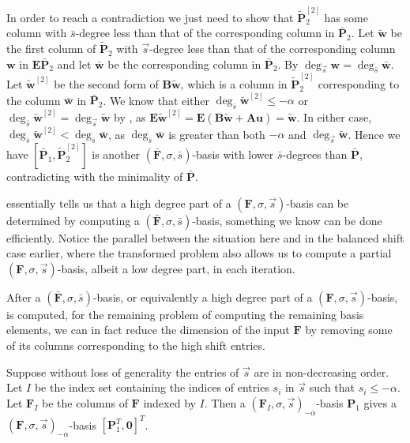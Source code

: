 \begin{pf}
In order to reach a contradiction we just need to show that $\tilde{\mathbf{P}}_{2}^{[2]}$
has some column with $\bar{s}$-degree less than that of the corresponding
column in $\bar{\mathbf{P}}_{2}$. Let $\tilde{\mathbf{w}}$ be the
first column of $\tilde{\mathbf{P}}_{2}$ with $\vec{s}$-degree less
than that of the corresponding column $\mathbf{w}$ in $\mathbf{E}\bar{\mathbf{P}}_{2}$
and let $\bar{\mathbf{w}}$ be the corresponding column in $\bar{\mathbf{P}}_{2}$.
By  $\deg_{\vec{s}}\mathbf{w}=\deg_{\bar{s}}\bar{\mathbf{w}}$.
Let $\tilde{\mathbf{w}}^{[2]}$ be the second form of $\mathbf{B}\tilde{\mathbf{w}}$,
which is a column in $\tilde{\mathbf{P}}_{2}^{[2]}$ corresponding
to the column $\bar{\mathbf{w}}$ in $\bar{\mathbf{P}}_{2}$. We know
that either $\deg_{\bar{s}}\tilde{\mathbf{w}}^{[2]}\le-\alpha$ or
$\deg_{\bar{s}}\tilde{\mathbf{w}}^{[2]}=\deg_{\vec{s}}\tilde{\mathbf{w}}$
by , as $\mathbf{E}\tilde{\mathbf{w}}^{[2]}=\mathbf{E}(\mathbf{B}\tilde{\mathbf{w}}+\mathbf{A}\mathbf{u})=\tilde{\mathbf{w}}$.
In either case, $\deg_{\bar{s}}\tilde{\mathbf{w}}^{[2]}<\deg_{\bar{s}}\bar{\mathbf{w}}$,
as $\deg_{\bar{s}}\bar{\mathbf{w}}$ is greater than both $-\alpha$
and $\deg_{\vec{s}}\tilde{\mathbf{w}}$. Hence we have $[\bar{\mathbf{P}}_{1},\tilde{\mathbf{P}}_{2}^{[2]}]$
is another $\left(\bar{\mathbf{F}},\sigma,\bar{s}\right)$-basis with
lower $\bar{s}$-degrees than $\mathbf{\bar{P}}$, contradicting with
the minimality of $\bar{\mathbf{P}}$. 
\end{pf}
 essentially tells us that
a high degree part of a $\left(\mathbf{F},\sigma,\vec{s}\right)$-basis
can be determined by computing a $\left(\bar{\mathbf{F}},\sigma,\bar{s}\right)$-basis,
something we know can be done efficiently. Notice the parallel between
the situation here and in the balanced shift case earlier, where the
transformed problem also allows us to compute a partial $\left(\mathbf{F},\sigma,\vec{s}\right)$-basis,
albeit a low degree part, in each iteration.

After a $\left(\bar{\mathbf{F}},\sigma,\bar{s}\right)$-basis, or
equivalently a high degree part of a $\left(\mathbf{F},\sigma,\vec{s}\right)$-basis,
is computed, for the remaining problem of computing the remaining
basis elements, we can in fact reduce the dimension of the input $\mathbf{F}$
by removing some of its columns corresponding to the high shift entries. 
\begin{thm}
\label{thm:zeroHighShiftEntries}Suppose without loss of generality
the entries of $\vec{s}$ are in non-decreasing order. Let $I$ be
the index set containing the indices of entries $s_{i}$ in $\vec{s}$
such that $s_{i}\le-\alpha$. Let $\mathbf{F}_{I}$ be the columns
of $\mathbf{F}$ indexed by $I$. Then a $\left(\mathbf{F}_{I},\sigma,\vec{s}\right)_{-\alpha}$-basis
\textbf{$\mathbf{P}_{1}$} gives a $\left(\mathbf{F},\sigma,\vec{s}\right)_{-\alpha}$-basis
$\left[\mathbf{P}_{1}^{T},\mathbf{0}\right]^{T}$. 
\end{thm}

